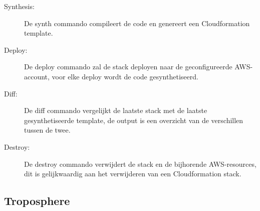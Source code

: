 \begin{description}
    \item[Synthesis:] De synth commando compileert de code en genereert een Cloudformation template.
    \item[Deploy:] De deploy commando zal de stack deployen naar de geconfigureerde AWS-account, voor elke deploy wordt de code gesynthetiseerd.
    \item[Diff:] De diff commando vergelijkt de laatste stack met de laatste gesynthetiseerde template, de output is een overzicht van de verschillen tussen de twee.
    \item[Destroy:] De destroy commando verwijdert de stack en de bijhorende AWS-resources, dit is gelijkwaardig aan het verwijderen van een Cloudformation stack.
\end{description}

\subsection{Troposphere}
\label{sec:service-troposphere}